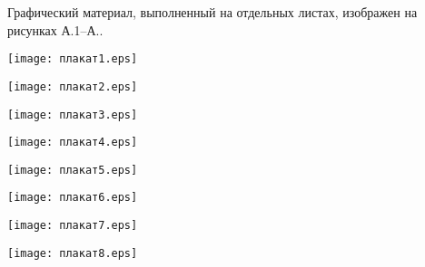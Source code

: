 
Графический материал, выполненный на отдельных листах,
изображен на рисунках А.1--А..
\setcounter{числоПлакатов}{0}

\renewcommand{\thefigure}{А.\arabic{figure}} %

\begin{landscape}

\begin{плакат}
    \texttt{[image: плакат1.eps]}
    \label{pl1:image}      
\end{плакат}

\begin{плакат}
    \texttt{[image: плакат2.eps]}
    \label{pl2:image}      
\end{плакат}

\begin{плакат}
    \texttt{[image: плакат3.eps]}
    \label{pl3:image}      
\end{плакат}

\begin{плакат}
	\texttt{[image: плакат4.eps]}
	\label{pl4:image}      
\end{плакат}

\begin{плакат}
	\texttt{[image: плакат5.eps]}
	\label{pl5:image}      
\end{плакат}

\begin{плакат}
	\texttt{[image: плакат6.eps]}
	\label{pl6:image}      
\end{плакат}

\begin{плакат}
	\texttt{[image: плакат7.eps]}
	\label{pl7:image}      
\end{плакат}

\begin{плакат}
	\texttt{[image: плакат8.eps]}
	\label{pl8:image}      
\end{плакат}

\end{landscape}
